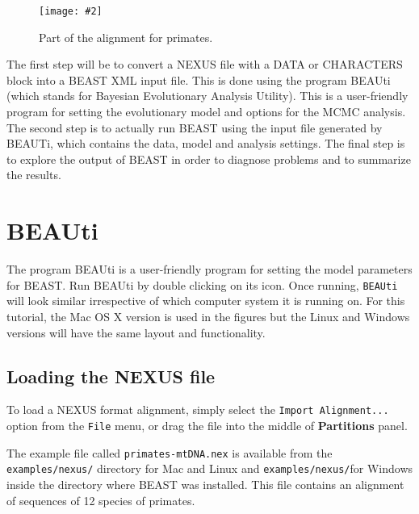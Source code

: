 \documentclass[11pt]{article}
\newcommand{\TODO}[1]{}
\theoremstyle{plain}%
\theoremstyle{definition}
\theoremstyle{remark}
\newcommand{\includeimage}[2][]{%
\texttt{[image: \#2]}
}
\begin{document}
\begin{figure}	
\centering
\includeimage[width=\textwidth]{figures/AlignmentViewer}
\label{fig:primateAlignment}
\caption{Part of the alignment for primates.}
\end{figure}

The first step will be to convert a NEXUS file with a DATA or CHARACTERS block into a BEAST XML input file. This is done using the program BEAUti (which stands for Bayesian Evolutionary Analysis Utility). 
This is a user-friendly program for setting the evolutionary model and options for the MCMC analysis. 
The second step is to actually run BEAST using the input file generated by BEAUTi,  which
contains the data, model and analysis settings. 
The final step is to explore the output of BEAST in order to diagnose problems and to summarize the results.

\section{BEAUti}

The program BEAUti is a user-friendly program for setting the
model parameters for BEAST. Run BEAUti by double clicking on its icon. Once running, \texttt{BEAUti} will look similar irrespective
of which computer system it is running on. For this tutorial, the Mac OS X version is used in the figures but
the Linux and Windows versions will have the same layout and functionality.

\TODO{Provide instructions for executing BEAUti  in a Linux environment.}

\subsection{Loading the NEXUS file }

To load a NEXUS format alignment, simply select the \texttt{Import Alignment...} option from the \texttt{File} menu, or drag the file into the middle of {\bf Partitions} panel. 

The example file called \texttt{primates-mtDNA.nex} is available from the {\tt examples/nexus/} directory for Mac and Linux and  {\tt examples/nexus/}for Windows inside the directory where BEAST was installed.
This file contains an alignment of sequences of 12 species of primates. 
\end{document}
